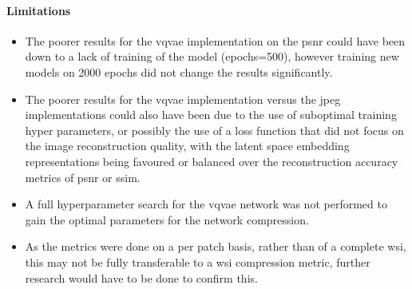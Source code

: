 \documentclass[review]{elsarticle}
\begin{document}


\paragraph{Limitations}
\begin{itemize}[noitemsep,nolistsep]
\item The poorer results for the \gls{vqvae} implementation on the \gls{psnr} could have been down to a lack of training of the model (epochs=500), however training new models on 2000 epochs did not change the results significantly.
\item The poorer results for the \gls{vqvae} implementation versus the \gls{jpeg} implementations could also have been due to the use of suboptimal training hyper parameters, or possibly the use of a loss function that did not focus on the image reconstruction quality, with the latent space embedding representations being favoured or balanced over the reconstruction accuracy metrics of \gls{psnr} or \gls{ssim}.
\item A full hyperparameter search for the \gls{vqvae} network was not performed to gain the optimal parameters for the network compression.
\item As the metrics were done on a per patch basis, rather than of a complete \gls{wsi}, this may not be fully transferable to a \gls{wsi} compression metric, further research would have to be done to confirm this.
\end{itemize}
\end{document}
